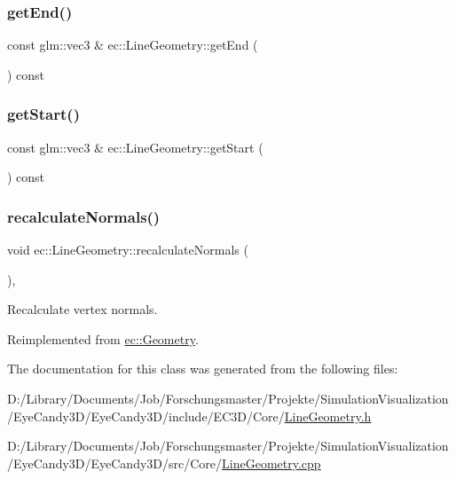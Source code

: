 \subsubsection{\texorpdfstring{get\+End()}{getEnd()}}
{\footnotesize\ttfamily const glm\+::vec3 \& ec\+::\+Line\+Geometry\+::get\+End (\begin{DoxyParamCaption}{ }\end{DoxyParamCaption}) const}

\mbox{\label{classec_1_1_line_geometry_a68975a8bddebc31db08839ec6064a864}} 
\subsubsection{\texorpdfstring{get\+Start()}{getStart()}}
{\footnotesize\ttfamily const glm\+::vec3 \& ec\+::\+Line\+Geometry\+::get\+Start (\begin{DoxyParamCaption}{ }\end{DoxyParamCaption}) const}

\mbox{\label{classec_1_1_line_geometry_a7a0b22930aa566c97d5f86f2a8246696}} 
\subsubsection{\texorpdfstring{recalculate\+Normals()}{recalculateNormals()}}
{\footnotesize\ttfamily void ec\+::\+Line\+Geometry\+::recalculate\+Normals (\begin{DoxyParamCaption}{ }\end{DoxyParamCaption})\hspace{0.3cm}{\ttfamily [override]}, {\ttfamily [virtual]}}

Recalculate vertex normals. 

Reimplemented from \mbox{\hyperlink{classec_1_1_geometry_a228d4a0fa01a17379f24aee2c769b501}{ec\+::\+Geometry}}.



The documentation for this class was generated from the following files\+:\begin{DoxyCompactItemize}
\item 
D\+:/\+Library/\+Documents/\+Job/\+Forschungsmaster/\+Projekte/\+Simulation\+Visualization/\+Eye\+Candy3\+D/\+Eye\+Candy3\+D/include/\+E\+C3\+D/\+Core/\mbox{\hyperlink{_line_geometry_8h}{Line\+Geometry.\+h}}\item 
D\+:/\+Library/\+Documents/\+Job/\+Forschungsmaster/\+Projekte/\+Simulation\+Visualization/\+Eye\+Candy3\+D/\+Eye\+Candy3\+D/src/\+Core/\mbox{\hyperlink{_line_geometry_8cpp}{Line\+Geometry.\+cpp}}\end{DoxyCompactItemize}
